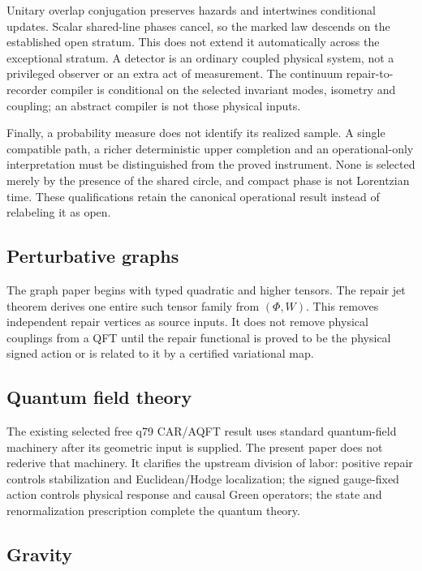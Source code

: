\documentclass[11pt,a4paper]{article}
\begin{document}
Unitary overlap conjugation preserves hazards and intertwines conditional
updates. Scalar shared-line phases cancel, so the marked law descends on
the established open stratum. This does not extend it automatically across
the exceptional stratum. A detector is an ordinary coupled physical system,
not a privileged observer or an extra act of measurement. The continuum
repair-to-recorder compiler is conditional on the selected invariant modes,
isometry and coupling; an abstract compiler is not those physical inputs.

Finally, a probability measure does not identify its realized sample.
A single compatible path, a richer deterministic upper completion and
an operational-only interpretation must be distinguished from the
proved instrument. None is selected merely by the presence of the shared
circle, and compact phase is not Lorentzian time. These qualifications
retain the canonical operational result instead of relabeling it as open.

\subsection{Perturbative graphs}

The graph paper begins with typed quadratic and higher tensors.  The repair
jet theorem derives one entire such tensor family from \((\Phi,W)\).  This
removes independent repair vertices as source inputs.  It does not remove
physical couplings from a QFT until the repair functional is proved to be the
physical signed action or is related to it by a certified variational map.

\subsection{Quantum field theory}

The existing selected free q79 CAR/AQFT result uses standard quantum-field
machinery after its geometric input is supplied.  The present paper does not
rederive that machinery.  It clarifies the upstream division of labor:
positive repair controls stabilization and Euclidean/Hodge localization;
the signed gauge-fixed action controls physical response and causal Green
operators; the state and renormalization prescription complete the quantum
theory.

\subsection{Gravity}
\end{document}
